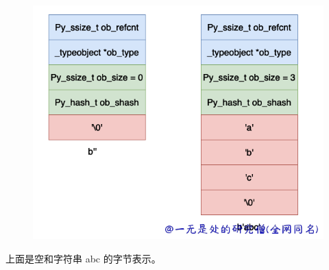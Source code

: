     \begin{figure}[h]
        \centering
            \includegraphics[scale=.25]{images/29-bytes.png}
						\caption{ }
        \label{fig:my_label}
    \end{figure}
    
上面是空和字符串 abc 的字节表示。
